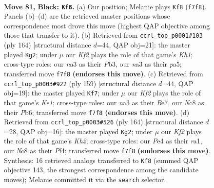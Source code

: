 \documentclass[11pt]{article}
\begin{document}
\clearpage

\begin{figure}[p]\centering
\begin{subfigure}{0.46\textwidth}\centering
\resizebox{\linewidth}{!}{%
\newchessgame
\chessboard[
  setfen={2n5/2P2k1K/p7/P4p1p/4pBb1/N1r3P1/8/R7 b - - 69 81},
  showmover=false,
  pgfstyle=straightmove, color=movearrow, markmove={f7-f8}
]}
\caption{}
\end{subfigure}\hfill
\begin{subfigure}{0.46\textwidth}\centering
\resizebox{\linewidth}{!}{%
\newchessgame
\chessboard[
  setfen={5k2/2b5/5p2/pR3B1p/P3P2P/1Pr5/8/7K w - - 1 83},
  showmover=false,
  pgfstyle=straightmove, color=movearrow, markmove={h1-g2}
]}
\caption{}
\end{subfigure}
\\[4pt]
\begin{subfigure}{0.46\textwidth}\centering
\resizebox{\linewidth}{!}{%
\newchessgame
\chessboard[
  setfen={4k3/2R1b2p/1p5P/p3p1p1/P1P1P1K1/1r3B2/8/8 b - - 10 80},
  showmover=false,
  pgfstyle=straightmove, color=movearrow, markmove={e8-f7}
]}
\caption{}
\end{subfigure}\hfill
\begin{subfigure}{0.46\textwidth}\centering
\resizebox{\linewidth}{!}{%
\newchessgame
\chessboard[
  setfen={8/7p/1p3k2/1BbR1p1P/P1P2P2/8/7K/r7 w - - 85 83},
  showmover=false,
  pgfstyle=straightmove, color=movearrow, markmove={h2-g2}
]}
\caption{}
\end{subfigure}
\caption{\textbf{Move 81, Black: \texttt{Kf8}.} (a) Our position; Melanie plays \texttt{Kf8} (\texttt{f7f8}). Panels (b)--(d) are the retrieved master positions whose correspondence most drove this move (highest QAP objective among those that transfer to it). (b) Retrieved from \texttt{ccrl\_top\_p0001\#103} (ply 164) [structural distance $d$=44, QAP obj=21]: the master played \texttt{Kg2}; under $\mu$ our \emph{Kf2} plays the role of that game's \emph{Kh1}; cross-type roles: our \emph{n}a3 as their \emph{P}b3, our \emph{n}a3 as their \emph{p}a5; transferred move \texttt{f7f8} \textbf{(endorses this move)}. (c) Retrieved from \texttt{ccrl\_top\_p0003\#922} (ply 159) [structural distance $d$=44, QAP obj=19]: the master played \texttt{Kf7}; under $\mu$ our \emph{Kf2} plays the role of that game's \emph{Ke1}; cross-type roles: our \emph{n}a3 as their \emph{B}e7, our \emph{N}c8 as their \emph{P}b6; transferred move \texttt{f7f8} \textbf{(endorses this move)}. (d) Retrieved from \texttt{ccrl\_top\_p0003\#526} (ply 164) [structural distance $d$=28, QAP obj=16]: the master played \texttt{Kg2}; under $\mu$ our \emph{Kf2} plays the role of that game's \emph{Kh2}; cross-type roles: our \emph{P}e4 as their \emph{r}a1, our \emph{N}c8 as their \emph{P}f4; transferred move \texttt{f7f8} \textbf{(endorses this move)}. Synthesis: 16 retrieved analogs transferred to \texttt{Kf8} (summed QAP objective 143, the strongest correspondence among the candidate moves); Melanie committed it via the \texttt{search} selector.}
\label{fig:thought-m161}
\end{figure}
\end{document}
